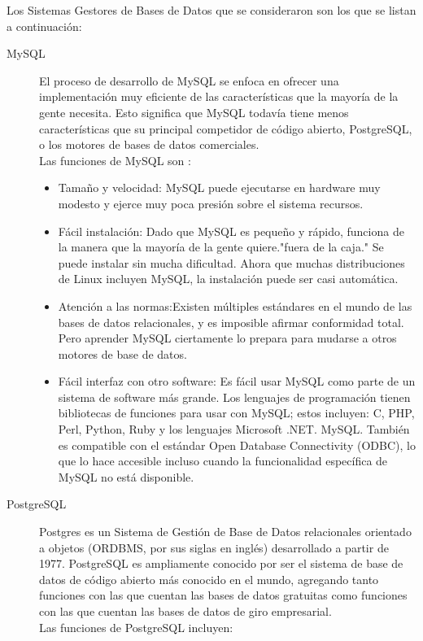     Los Sistemas Gestores de Bases de Datos que se consideraron son los que se listan a continuación:
    \begin{description}
        \item[MySQL] El proceso de desarrollo de MySQL se enfoca en ofrecer una implementación muy eficiente de las características que la mayoría de la gente necesita. Esto significa que MySQL todavía tiene menos características que su principal competidor de código abierto, PostgreSQL, o los motores de bases de datos comerciales.\\
        Las funciones de MySQL son :
        \begin{itemize}
            \item Tamaño y velocidad: MySQL puede ejecutarse en hardware muy modesto y ejerce muy poca presión sobre el sistema recursos.
            \item Fácil instalación: Dado que MySQL es pequeño y rápido, funciona de la manera que la mayoría de la gente quiere."fuera de la caja." Se puede instalar sin mucha dificultad. Ahora que muchas distribuciones de Linux incluyen MySQL, la instalación puede ser casi automática.
            \item Atención a las normas:Existen múltiples estándares en el mundo de las bases de datos relacionales, y es imposible afirmar conformidad total. Pero aprender MySQL ciertamente lo prepara para mudarse a otros motores de base de datos.
            \item Fácil interfaz con otro software: Es fácil usar MySQL como parte de un sistema de software más grande. Los lenguajes de programación tienen bibliotecas de funciones para usar con MySQL; estos incluyen: C, PHP, Perl, Python, Ruby y los lenguajes Microsoft .NET. MySQL. También es compatible con el estándar Open Database Connectivity (ODBC), lo que lo hace accesible incluso cuando la funcionalidad específica de MySQL no está disponible.
\end{itemize}
       \item[PostgreSQL] Postgres es un Sistema de Gestión de Base de Datos relacionales orientado a objetos (ORDBMS, por sus siglas en inglés) desarrollado a partir de 1977. PostgreSQL es ampliamente conocido por ser el sistema de base de datos de código abierto más conocido en el mundo, agregando tanto funciones con las que cuentan las bases de datos gratuitas como funciones con las que cuentan las bases de datos de giro empresarial.\\
        Las funciones de PostgreSQL incluyen:
        \begin{itemize}

\end{itemize}
\end{description}
